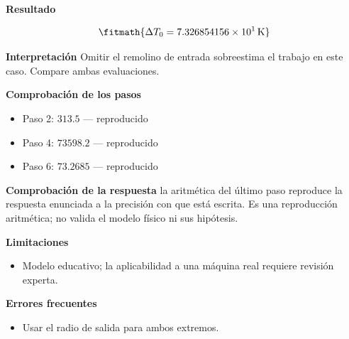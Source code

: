 \documentclass[10pt,openany]{book}
\begin{document}
\begin{tcolorbox}[title={Problema resuelto 3}, studiumworked, breakable]
\noindent\textbf{Resultado}

\[
\fitmath{\Delta T_0=7.326854156\times10^{1}\,\mathrm{K}}
\]

\noindent\textbf{Interpretación}
Omitir el remolino de entrada sobreestima el trabajo en este caso. Compare ambas evaluaciones.

\noindent\textbf{Comprobación de los pasos}
\begin{itemize}
\item Paso 2: $313.5$ — reproducido
\item Paso 4: $73598.2$ — reproducido
\item Paso 6: $73.2685$ — reproducido
\end{itemize}

\noindent\textbf{Comprobación de la respuesta} la aritmética del último paso reproduce la respuesta enunciada a la precisión con que está escrita. Es una reproducción aritmética; no valida el modelo físico ni sus hipótesis.

\noindent\textbf{Limitaciones}
\begin{itemize}
\item Modelo educativo; la aplicabilidad a una máquina real requiere revisión experta.
\end{itemize}

\noindent\textbf{Errores frecuentes}
\begin{itemize}
\item Usar el radio de salida para ambos extremos.
\end{itemize}
\end{tcolorbox}
\end{document}
